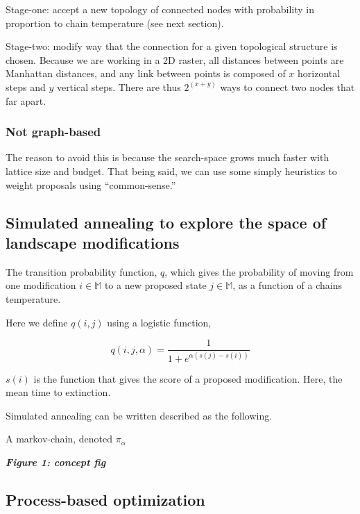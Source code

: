 \documentclass[10pt,oneside]{article}
\begin{document}
Stage-one: accept a new topology of connected nodes with probability in
proportion to chain temperature (see next section).

Stage-two: modify way that the connection for a given topological
structure is chosen. Because we are working in a 2D raster, all
distances between points are Manhattan distances, and any link between
points is composed of \(x\) horizontal steps and \(y\) vertical steps.
There are thus \(2^{(x+y)}\) ways to connect two nodes that far apart.

\hypertarget{not-graph-based}{%
\subsubsection{Not graph-based}\label{not-graph-based}}

The reason to avoid this is because the search-space grows much faster
with lattice size and budget. That being said, we can use some simply
heuristics to weight proposals using ``common-sense.''

\hypertarget{simulated-annealing-to-explore-the-space-of-landscape-modifications}{%
\subsection{Simulated annealing to explore the space of landscape
modifications}\label{simulated-annealing-to-explore-the-space-of-landscape-modifications}}

The transition probability function, \(q\), which gives the probability
of moving from one modification \(i \in \mathbb{M}\) to a new proposed
state \(j \in \mathbb{M}\), as a function of a chains temperature.

Here we define \(q(i,j)\) using a logistic function,

\[q(i,j, \alpha) = \frac{1}{1 + e^{\alpha (s(j) - s(i))}}\]

\(s(i)\) is the function that gives the score of a proposed
modification. Here, the mean time to extinction.

Simulated annealing can be written described as the following.

A markov-chain, denoted \(\pi_\alpha\)

\textbf{\emph{Figure 1: concept fig}}

\hypertarget{process-based-optimization}{%
\subsection{Process-based
optimization}\label{process-based-optimization}}
\end{document}
